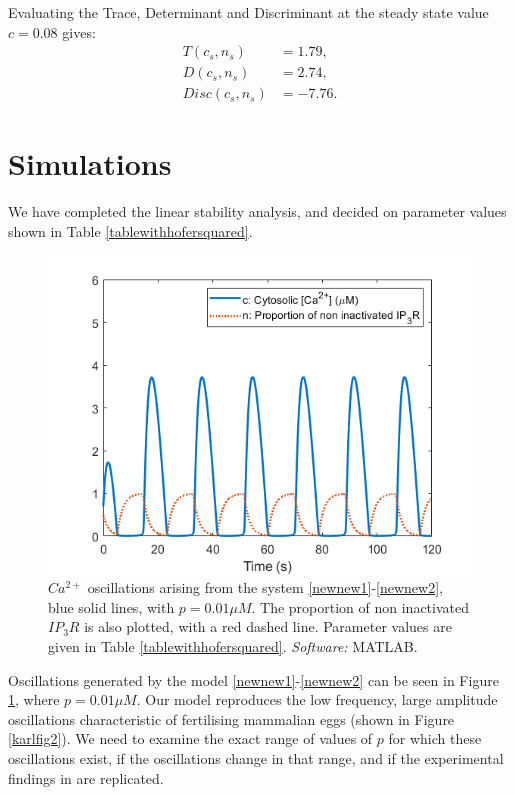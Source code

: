 Evaluating the Trace, Determinant and Discriminant at the steady state value $c=0.08$ gives:
\begin{align}
T(c_s,n_s)&= 1.79,\nonumber\\
D(c_s,n_s)&=2.74,\nonumber\\
Disc(c_s,n_s)&= -7.76.\nonumber
\end{align}

\section{Simulations}
We have completed the linear stability analysis, and decided on parameter values shown in Table \ref{tablewithhofersquared}.

\begin{figure}[h!!!t!!!b!!!p]
  \centering
  \includegraphics[width=0.8\linewidth]{Chapters/5_New_Model/extras/hofersquared.png}
  \caption{$Ca^{2+}$ oscillations arising from the system \eqref{newnew1}-\eqref{newnew2}, blue solid lines, with $p=0.01 \mu M$. The proportion of non inactivated $IP_3R$ is also plotted, with a red dashed line. Parameter values are given in Table \ref{tablewithhofersquared}. \textit{Software:} MATLAB.}\label{hofersquared}
\end{figure}

Oscillations generated by the model \eqref{newnew1}-\eqref{newnew2} can be seen in Figure \ref{hofersquared}, where $p=0.01 \mu M$. Our model reproduces
the low frequency, large amplitude oscillations characteristic of fertilising mammalian eggs (shown in Figure \ref{karlfig2}). We need to examine the exact range of values of $p$ for which these oscillations exist, if the oscillations change in that range, and if the experimental findings in  are replicated. 

